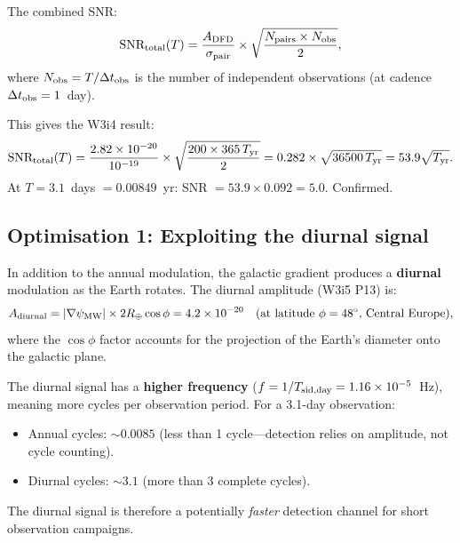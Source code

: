 \documentclass[11pt]{article}
\newcommand{\ee}[1]{\times 10^{#1}}
\begin{document}
The combined SNR:
\begin{equation}
\text{SNR}_{\rm total}(T) = \frac{A_{\rm DFD}}{\sigma_{\rm pair}}
\times\sqrt{\frac{N_{\rm pairs}\times N_{\rm obs}}{2}},
\label{eq:SNR-total}
\end{equation}
where $N_{\rm obs} = T/\Delta t_{\rm obs}$ is the number of independent
observations (at cadence $\Delta t_{\rm obs} = 1$~day).

This gives the W3i4 result:
\begin{equation}
\text{SNR}_{\rm total}(T) = \frac{2.82\ee{-20}}{10^{-19}}
\times\sqrt{\frac{200\times 365\,T_{\rm yr}}{2}}
= 0.282\times\sqrt{36500\,T_{\rm yr}} = 53.9\sqrt{T_{\rm yr}}.
\end{equation}
At $T = 3.1$~days $= 0.00849$~yr: SNR $= 53.9\times 0.092 = 5.0$.
Confirmed.

\subsection{Optimisation 1: Exploiting the diurnal signal}

In addition to the annual modulation, the galactic gradient produces a
\textbf{diurnal} modulation as the Earth rotates. The diurnal amplitude
(W3i5 P13) is:
\begin{equation}
A_{\rm diurnal} = |\nabla\psi_{\rm MW}|\times 2R_\oplus\cos\phi
= 4.2\ee{-20}\quad\text{(at latitude } \phi = 48^\circ\text{, Central Europe)},
\end{equation}
where the $\cos\phi$ factor accounts for the projection of the
Earth's diameter onto the galactic plane.

The diurnal signal has a \textbf{higher frequency} ($f = 1/T_{\rm sid,day}
= 1.16\ee{-5}$~Hz), meaning more cycles per observation period.
For a 3.1-day observation:
\begin{itemize}[nosep]
\item Annual cycles: $\sim 0.0085$ (less than 1 cycle---detection relies
  on amplitude, not cycle counting).
\item Diurnal cycles: $\sim 3.1$ (more than 3 complete cycles).
\end{itemize}

The diurnal signal is therefore a potentially \emph{faster} detection
channel for short observation campaigns.
\end{document}
